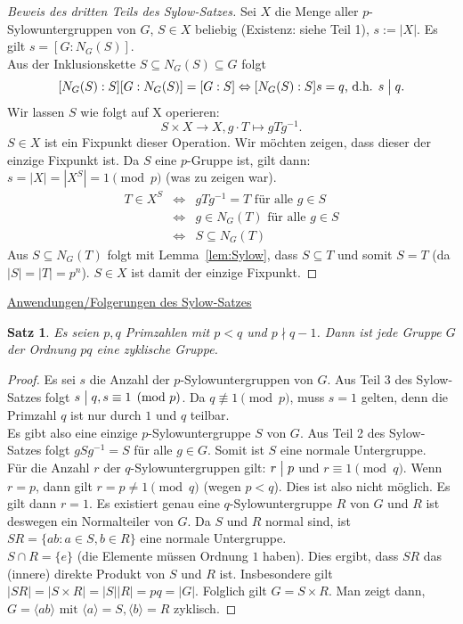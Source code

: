 \documentclass[12pt]{scrartcl} %
\newcommand{\divides}{\mathrel{\bigm|}}
\newtheorem{thm}{Satz}
\theoremstyle{definition}
\theoremstyle{remark}
\begin{document}
\begin{proof}[Beweis des dritten Teils des Sylow-Satzes]
	Sei $X$ die Menge aller $p$-Sylowuntergruppen von $G$, $S \in X$ beliebig (Existenz: siehe Teil 1), $s := |X|$. Es gilt $s = [G:N_G(S)]$. \\
	Aus der Inklusionskette $S \subseteq N_G(S) \subseteq G$ folgt
	$$[N_G(S):S] [G:N_G(S)] = [G:S] \Leftrightarrow [N_G(S):S] s = q \text{, d.h. } s \divides q.$$
	Wir lassen $S$ wie folgt auf X operieren:
	$$S \times X \rightarrow X, g \cdot T \mapsto gTg^{-1}.$$
	$S \in X$ ist ein Fixpunkt dieser Operation. Wir möchten zeigen, dass dieser der einzige Fixpunkt ist. Da $S$ eine $p$-Gruppe ist, gilt dann: $s = |X| = |X^S| = 1 \pmod{p}$ (was zu zeigen war).
	\begin{align*}
		T \in X^S &\Leftrightarrow &gTg^{-1} = T \text{ für alle } g \in S \\
		&\Leftrightarrow &g \in N_G(T) \text{ für alle } g \in S \\
		&\Leftrightarrow &S \subseteq N_G(T)
	\end{align*}
	Aus $S \subseteq N_G(T)$ folgt mit Lemma~\ref{lem:Sylow}, dass $S \subseteq T$ und somit $S = T$ (da $|S| = |T| = p^n$). $S \in X$ ist damit der einzige Fixpunkt.
\end{proof}

\underline{Anwendungen/Folgerungen des Sylow-Satzes}

\begin{thm}
	Es seien $p, q$ Primzahlen mit $p < q$ und $p \nmid q-1$. Dann ist jede Gruppe $G$ der Ordnung $pq$ eine zyklische Gruppe.
\end{thm}

\begin{proof}
	Es sei $s$ die Anzahl der $p$-Sylowuntergruppen von $G$. Aus Teil 3 des Sylow-Satzes folgt $s \divides q, s \equiv 1 \pmod{p}$. Da $q \not \equiv 1 \pmod{p}$, muss $s = 1$ gelten, denn die Primzahl $q$ ist nur durch $1$ und $q$ teilbar. \\
	Es gibt also eine einzige $p$-Sylowuntergruppe $S$ von $G$. Aus Teil 2 des Sylow-Satzes folgt $gSg^{-1} = S$ für alle $g \in G$. Somit ist $S$ eine normale Untergruppe. \\
	Für die Anzahl $r$ der $q$-Sylowuntergruppen gilt: $r \divides p$ und $r \equiv 1 \pmod{q}$. Wenn $r = p$, dann gilt $r = p \not = 1 \pmod{q}$ (wegen $p < q$). Dies ist also nicht möglich. Es gilt dann $r = 1$. Es existiert genau eine $q$-Sylowuntergruppe $R$ von $G$ und $R$ ist deswegen ein Normalteiler von $G$. Da $S$ und $R$ normal sind, ist $SR = \{ ab : a \in S, b \in R\}$ eine normale Untergruppe. \\
	$S \cap R = \{ e\}$ (die Elemente müssen Ordnung $1$ haben). Dies ergibt, dass $SR$ das (innere) direkte Produkt von $S$ und $R$ ist. Insbesondere gilt $|SR| = |S \times R| = |S||R| = pq = |G|$. Folglich gilt $G = S \times R$. Man zeigt dann, $G = \langle ab \rangle \text{ mit } \langle a \rangle = S, \langle b \rangle = R$ zyklisch.
\end{proof}
\end{document}
